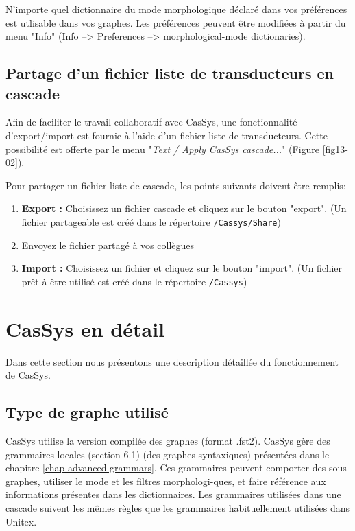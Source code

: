 N'importe quel dictionnaire du mode morphologique déclaré dans vos préférences est utlisable dans vos
graphes.
Les  préférences peuvent être modifiées à partir du menu "Info" (Info -->
Preferences --> morphological-mode dictionaries).

\subsection{Partage d'un fichier liste de transducteurs en cascade}
\label{subsec:shareCascade}

Afin de faciliter le travail collaboratif avec CasSys, une fonctionnalité d'export/import est
fournie à l'aide d'un fichier liste de transducteurs. Cette possibilité est offerte par le menu
"\textit{Text / Apply CasSys cascade...}" (Figure \ref{fig13-02}).

Pour partager un fichier liste de cascade, les points suivants doivent être remplis:
\begin{enumerate}
\item \textbf{Export :} Choisissez un fichier cascade et cliquez sur le bouton "export".
	(Un fichier partageable est créé dans le répertoire \texttt{/Cassys/Share})
\item Envoyez le fichier partagé à vos collègues
\item \textbf{Import :} Choisissez un fichier  et cliquez sur le bouton "import".
	(Un fichier prêt à être utilisé est créé dans le répertoire \texttt{/Cassys})
\end{enumerate}

\section{CasSys en détail}

Dans cette section nous présentons une description détaillée du fonctionnement de CasSys.

\subsection{Type de graphe utilisé}

CasSys utilise la version compilée des graphes (format .fst2). CasSys gère des grammaires locales
(section 6.1) (des graphes syntaxiques) présentées dans le chapitre \ref{chap-advanced-grammars}. Ces
grammaires peuvent comporter des sous-graphes, utiliser le mode et les filtres morphologi-ques, et
faire référence aux informations présentes dans les dictionnaires. Les grammaires utilisées dans une
cascade suivent les mêmes règles que les grammaires habituellement
utilisées dans Unitex.

